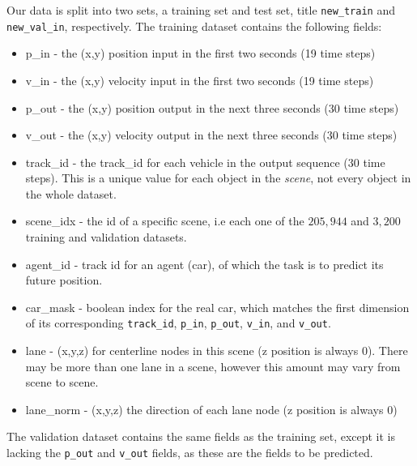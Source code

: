 \documentclass{article}
\begin{document}
      Our data is split into two sets, a training set and test set, title \texttt{new\_train} and 
      \texttt{new\_val\_in}, respectively. The training dataset contains the following fields: 
      
      \begin{itemize}            
          \item {\selectfont p\_in} - the (x,y) position input in the first two seconds (19 time steps)
          \item {\selectfont v\_in} - the (x,y) velocity input in the first two seconds (19 time steps)
          \item {\selectfont p\_out} - the (x,y) position output in the next three seconds (30 time steps)
          \item {\selectfont v\_out} - the (x,y) velocity output in the next three seconds (30 time steps)
          \item {\selectfont track\_id} - the track\_id for each vehicle in the output sequence (30 time steps). This 
                is a unique value for each object in the \emph{scene}, not every object in the whole dataset.
          \item {\selectfont scene\_idx} - the id of a specific scene, i.e each one of the $205,944$ and $3,200$  
                training and validation datasets.
          \item {\selectfont agent\_id} - track id for an agent (car), of which the task is to predict its future position. 
          \item {\selectfont car\_mask} - boolean index for the real car, which matches the first dimension of its 
               corresponding \texttt{track\_id}, \texttt{p\_in}, \texttt{p\_out}, \texttt{v\_in}, and \texttt{v\_out}. 
          \item {\selectfont lane} - (x,y,z) for centerline nodes in this scene (z position is always $0$). 
                There may be more than one lane in a scene, however this amount may vary from scene to scene.
          \item {\selectfont lane\_norm} - (x,y,z) the direction of each lane node (z position is always $0$)
      \end{itemize}

      The validation dataset contains the same fields as the training set, except it is lacking the \texttt{p\_out} and
      \texttt{v\_out} fields, as these are the fields to be predicted. 
      
\end{document}
